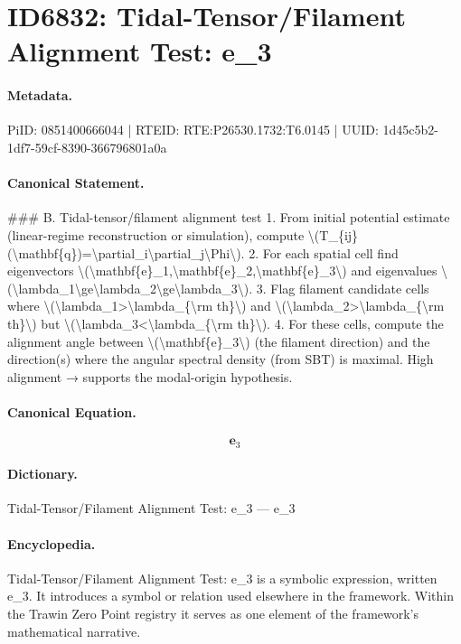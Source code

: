\section*{ID6832: Tidal-Tensor/Filament Alignment Test: e\_3}
\paragraph{Metadata.}
PiID: 0851400666044 | RTEID: RTE:P26530.1732:T6.0145 | UUID: 1d45c5b2-1df7-59cf-8390-366796801a0a

\paragraph{Canonical Statement.}
\#\#\# B. Tidal-tensor/filament alignment test 1. From initial potential estimate (linear-regime reconstruction or simulation), compute \textbackslash{}(T\_\{ij\}(\textbackslash{}mathbf\{q\})=\textbackslash{}partial\_i\textbackslash{}partial\_j\textbackslash{}Phi\textbackslash{}). 2. For each spatial cell find eigenvectors \textbackslash{}(\textbackslash{}mathbf\{e\}\_1,\textbackslash{}mathbf\{e\}\_2,\textbackslash{}mathbf\{e\}\_3\textbackslash{}) and eigenvalues \textbackslash{}(\textbackslash{}lambda\_1\textbackslash{}ge\textbackslash{}lambda\_2\textbackslash{}ge\textbackslash{}lambda\_3\textbackslash{}). 3. Flag filament candidate cells where \textbackslash{}(\textbackslash{}lambda\_1>\textbackslash{}lambda\_\{\textbackslash{}rm th\}\textbackslash{}) and \textbackslash{}(\textbackslash{}lambda\_2>\textbackslash{}lambda\_\{\textbackslash{}rm th\}\textbackslash{}) but \textbackslash{}(\textbackslash{}lambda\_3<\textbackslash{}lambda\_\{\textbackslash{}rm th\}\textbackslash{}). 4. For these cells, compute the alignment angle between \textbackslash{}(\textbackslash{}mathbf\{e\}\_3\textbackslash{}) (the filament direction) and the direction(s) where the angular spectral density (from SBT) is maximal. High alignment → supports the modal-origin hypothesis.

\paragraph{Canonical Equation.}
\[
\mathbf{e}_3
\]

\paragraph{Dictionary.}
Tidal-Tensor/Filament Alignment Test: e\_3 — e\_3

\paragraph{Encyclopedia.}
Tidal-Tensor/Filament Alignment Test: e\_3 is a symbolic expression, written e\_3. It introduces a symbol or relation used elsewhere in the framework. Within the Trawin Zero Point registry it serves as one element of the framework's mathematical narrative.

